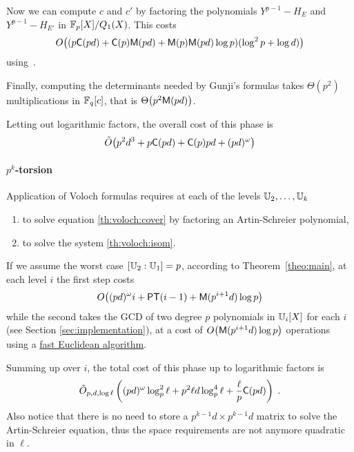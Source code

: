 Now we can compute $c$ and $c'$ by factoring the polynomials
$Y^{p-1}-H_E$ and $Y^{p-1}-H_{E'}$ in $\mathbb{F}_p[X]/Q_1(X)$. This costs
\[O\bigl((p\mathsf{C}(pd) + \mathsf{C}(p)\mathsf{M}(pd) + \mathsf{M}(p)\mathsf{M}(pd)\log
p)(\log^2 p+\log d)\bigr)\] using~\cite[Section 3]{kaltofen+shoup97}.

Finally, computing the determinants needed by Gunji's formulas takes
$\Theta(p^2)$ multiplications in $\mathbb{F}_q[c]$, that is
$\Theta\bigl(p^2\mathsf{M}(pd)\bigr)$.

Letting out logarithmic factors, the overall cost of this phase is
\begin{equation}
  \label{eq:gunji-complexity}
  \tilde{O}\bigl(p^2d^3 + p\mathsf{C}(pd) + \mathsf{C}(p)pd + (pd)^\omega \bigr)
\end{equation}


\paragraph{$p^k$-torsion}
Application of Voloch formulas requires at each of the levels
$\mathbb{U}_2,\ldots,\mathbb{U}_k$
\begin{enumerate}
\item to solve equation \eqref{th:voloch:cover} by factoring an
  Artin-Schreier polynomial,
\item to solve the system \eqref{th:voloch:isom}.
\end{enumerate}
If we assume the worst case $[\mathbb{U}_2:\mathbb{U}_1] = p$, according to
Theorem~\ref{theo:main}, at each level $i$ the first step costs
\begin{equation*}
  O\bigl((pd)^\omega i + {\mathsf{PT}}(i-1) + \mathsf{M}(p^{i+1}d)\log p\bigr)
\end{equation*}
while the second takes the GCD of two degree $p$ polynomials in
$\mathbb{U}_i[X]$ for each $i$ (see Section \ref{sec:implementation}), at a
cost of $O\bigl(\mathsf{M}(p^{i+1}d)\log p\bigr)$ operations using a
\hyperref[sec:eucl-algor-rati]{fast Euclidean algorithm}.

Summing up over $i$, the total cost of this phase up to logarithmic
factors is
\begin{equation}
  \label{eq:C2-AS:complexity:p^k}
  \tilde{O}_{p,d,\log\ell}\left((pd)^\omega \log_p^2\ell + p^2\ell d\log_p^4\ell +
  \frac{\ell}{p}\mathsf{C}(pd)\right)
  \;\text{.}  
\end{equation}
Also notice that there is no need to store a $p^{k-1}d\times p^{k-1}d$
matrix to solve the Artin-Schreier equation, thus the space
requirements are not anymore quadratic in $\ell$.


